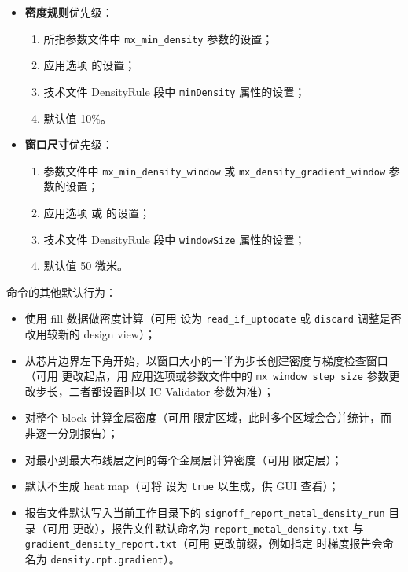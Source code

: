 \begin{itemize}
  \item \textbf{密度规则}优先级：
        \begin{enumerate}
          \item {} 所指参数文件中 \texttt{mx\_min\_density} 参数的设置；
          \item 应用选项  的设置；
          \item 技术文件 DensityRule 段中 \texttt{minDensity} 属性的设置；
          \item 默认值 10\%。
        \end{enumerate}
  \item \textbf{窗口尺寸}优先级：
        \begin{enumerate}
          \item 参数文件中 \texttt{mx\_min\_density\_window} 或 \texttt{mx\_density\_gradient\_window} 参数的设置；
          \item 应用选项  或  的设置；
          \item 技术文件 DensityRule 段中 \texttt{windowSize} 属性的设置；
          \item 默认值 50 微米。
        \end{enumerate}
\end{itemize}

命令的其他默认行为：
\begin{itemize}
  \item 使用 fill 数据做密度计算（可用  设为 \texttt{read\_if\_uptodate} 或 \texttt{discard} 调整是否改用较新的 design view）；
  \item 从芯片边界左下角开始，以窗口大小的一半为步长创建密度与梯度检查窗口（可用  更改起点，用  应用选项或参数文件中的 \texttt{mx\_window\_step\_size} 参数更改步长，二者都设置时以 IC Validator 参数为准）；
  \item 对整个 block 计算金属密度（可用  限定区域，此时多个区域会合并统计，而非逐一分别报告）；
  \item 对最小到最大布线层之间的每个金属层计算密度（可用  限定层）；
  \item 默认不生成 heat map（可将  设为 \texttt{true} 以生成，供 GUI 查看）；
  \item 报告文件默认写入当前工作目录下的 \texttt{signoff\_report\_metal\_density\_run} 目录（可用  更改），报告文件默认命名为 \texttt{report\_metal\_density.txt} 与 \texttt{gradient\_density\_report.txt}（可用  更改前缀，例如指定  时梯度报告会命名为 \texttt{density.rpt.gradient}）。
\end{itemize}

